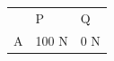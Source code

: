 \begin{enumerate}[noitemsep, label=\textbf{\arabic*}. ]
{{    %
    
        \begin{center}
      
      \label{m38819*id197541}
      
    \noindent
    \begin{tabular}[t]{|l|l|l|}\hline
    
    
         &
    
    
        P &
    
    
        Q%
     \tabularnewline\cline{1-1}\cline{2-2}\cline{3-3}
    
    
        A &
    
    
        100 N &
    
    
        0 N%
     \tabularnewline\cline{1-1}\cline{2-2}\cline{3-3}
    
    

\end{tabular}
\end{center}}}
\end{enumerate}
